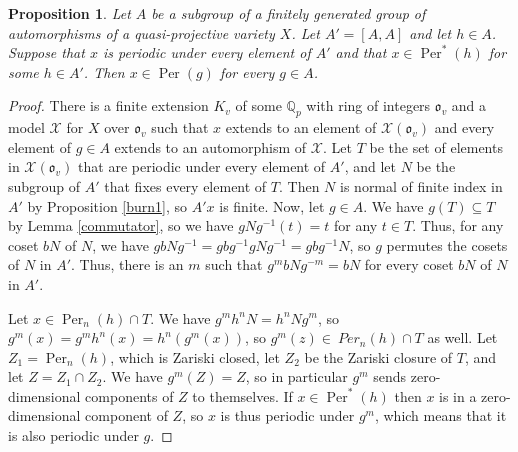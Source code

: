 \documentclass{amsart}
\newcommand{\bQ}{\mathbb{Q}}
\DeclareMathOperator{\Per}{Per}
\newcommand{\fo}{\mathfrak o}
\newcommand{\cX}{\mathcal X}
\newtheorem{prop}[thm]{Proposition}
\theoremstyle{definition}
\begin{document}
\begin{prop}\label{commutator2}
Let $A$ be a subgroup of a finitely generated group of automorphisms
of a quasi-projective variety $X$. Let $A' =[A,A]$ and let $h \in
A$. Suppose that $x$ is periodic under every element of $A'$ and that
$x \in \Per^*(h)$ for some $h \in A'$.  Then $x \in \Per(g)$ for
every $g \in A$.  
\end{prop} 
\begin{proof}
  There is a finite extension $K_v$ of some $\bQ_p$ with ring of
  integers $\fo_v$ and a model $\cX$ for $X$ over $\fo_v$ such that
  $x$ extends to an element of $\cX(\fo_v)$ and every element of
  $g \in A$ extends to an automorphism of $\cX$. Let $T$ be the set of
  elements in $\cX(\fo_v)$ that are periodic under every element of
  $A'$, and let $N$ be the subgroup of $A'$ that fixes every element
  of $T$.  Then $N$ is normal of finite index in $A'$ by Proposition
  \ref{burn1}, so $A'x$ is finite.  Now, let $g \in A$.  We have
  $g(T) \subseteq T$ by Lemma \ref{commutator}, so we have
  $g N g^{-1} (t) = t$ for any $t \in T$.  Thus, for any coset $bN$ of
  $N$, we have $g bN g^{-1}= gbg^{-1} g N g^{-1} = gbg^{-1} N$, so $g$
  permutes the cosets of $N$ in $A'$.  Thus, there is an $m$ such that
  $g^m b N g^{-m} = b N$ for every coset $bN$ of $N$ in $A'$.

  Let $x \in \Per_n(h) \cap T$.  We have $g^m h^n N = h^n N g^m$, so
  $g^m(x) = g^m h^n(x) = h^n(g^m(x))$, so $g^m(z) \in\ Per_n(h) \cap T$
  as well.  Let $Z_1 = \Per_n(h)$, which is Zariski closed, let $Z_2$
  be the Zariski closure of $T$, and let $Z = Z_1 \cap Z_2$. We have
  $g^m(Z) = Z$, so in particular $g^m$ sends zero-dimensional
  components of $Z$ to themselves. If $x \in \Per^*(h)$ then $x$ is in
  a zero-dimensional component of $Z$, so $x$ is thus periodic under
  $g^m$, which means that it is also periodic under $g$.
\end{proof}
\end{document}

